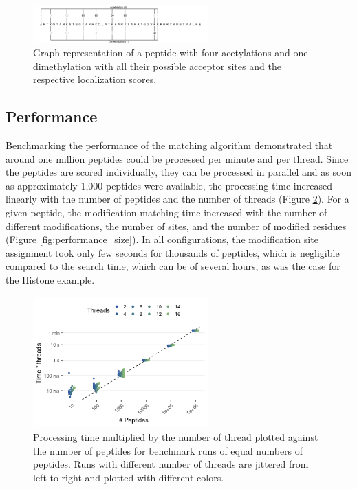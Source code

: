 \documentclass[]{article}
\begin{document}
 \begin{figure}[!tpb]
 	\centerline{\includegraphics[width=0.6\textwidth]{figures/figure_histone.png}}
 	\caption{Graph representation of a peptide with four acetylations and one dimethylation with all their possible acceptor sites and the respective localization scores.}\label{fig:histone_peptide}
 \end{figure}

 

\subsection{Performance}

Benchmarking the performance of the matching algorithm demonstrated that around one million peptides could be processed per minute and per thread. Since the peptides are scored individually, they can be processed in parallel and as soon as approximately 1,000 peptides were available, the processing time increased linearly with the number of peptides and the number of threads (Figure \ref{fig:performance_threads}). For a given peptide, the modification matching time increased with the number of different modifications, the number of sites, and the number of modified residues (Figure \ref{fig:performance_size}). In all configurations, the modification site assignment took only few seconds for thousands of peptides, which is negligible compared to the search time, which can be of several hours, as was the case for the Histone example.

\begin{figure}[!tpb]
	\centerline{\includegraphics[width=0.6\textwidth]{figures/benchmark_29.12.22_threads.png}}
	\caption{Processing time multiplied by the number of thread plotted against the number of peptides for benchmark runs of equal numbers of peptides. Runs with different number of threads are jittered from left to right and plotted with different colors.}\label{fig:performance_threads}
\end{figure}
\end{document}
